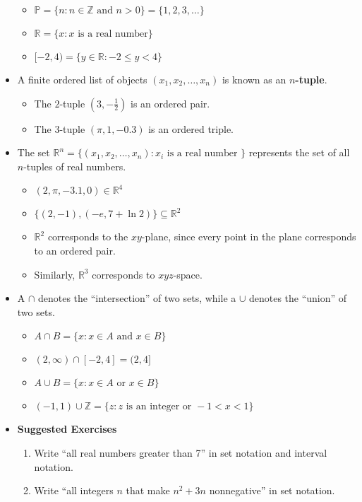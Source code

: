 \documentclass[12pt]{article}
\theoremstyle{plain}
\theoremstyle{definition}
\theoremstyle{remark}
\begin{document}
\begin{itemize}
\begin{itemize}
			\item $\mathbb{P} = \{n : n \in \mathbb{Z} \text{ and } n > 0\} = \{1,2,3,\dots\}$
			\item $\mathbb{R} = \{x : x \text{ is a real number}\}$
			\item $[-2,4) = \{y \in \mathbb{R} : -2 \leq y < 4 \}$
			\end{itemize} \newpage
		\item A finite ordered list of objects $(x_1,x_2,\dots,x_n)$ is known as an \textbf{$n$-tuple}.
			\begin{itemize}
			\item The $2$-tuple $(3,-\frac{1}{2})$ is an ordered pair.
			\item The $3$-tuple $(\pi,1,-0.3)$ is an ordered triple.
			\end{itemize}
		\item The set $\mathbb{R}^n=\{(x_1,x_2,\dots,x_n) : x_i \text{ is a real number }\}$ represents the set of all $n$-tuples of real numbers.
			\begin{itemize}
			\item $(2,\pi,-3.1,0) \in \mathbb{R}^4$
			\item $\{(2,-1),(-e,7+\ln 2)\} \subseteq \mathbb{R}^2$
			\item $\mathbb{R}^2$ corresponds to the $xy$-plane, since every point in the plane corresponds to an ordered pair.
			\item Similarly, $\mathbb{R}^3$ corresponds to $xyz$-space.
			\end{itemize}
		\item A $\cap$ denotes the ``intersection'' of two sets, while a $\cup$ denotes the ``union'' of two sets.
			\begin{itemize}
			\item $A \cap B = \{x : x\in A \text{ and } x \in B\}$
			\item $(2,\infty) \cap [-2,4] = (2,4]$
			\item $A \cup B = \{x : x\in A \text{ or } x \in B\}$
			\item $(-1,1) \cup \mathbb{Z} = \{z : z \text{ is an integer or } -1<x<1 \}$
			\end{itemize}
		\item \textbf{Suggested Exercises}
			\begin{enumerate}
			\item Write ``all real numbers greater than 7'' in set notation and interval notation.
			\item Write ``all integers $n$ that make $n^2+3n$ nonnegative'' in set notation.

\end{enumerate}
\end{itemize}
\end{document}
